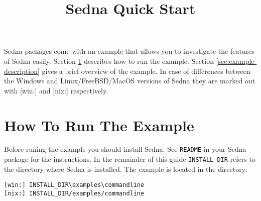 \documentclass[a4paper,12pt]{article}
\title{Sedna Quick Start}
\date{}
\begin{document}
\sloppy
\maketitle

Sedna packages come with an example that allows you to investigate the features
of Sedna easily. Section \ref{sec:how-to-run} describes how to run the example.
Section \ref{sec:example-description} gives a brief overview of the example. In
case of differences between the Windows and Linux/FreeBSD/MacOS versions of
Sedna they are marked out with [win:] and [nix:] respectively.

\section{How To Run The Example}
\label{sec:how-to-run}

Before runing the example you should install Sedna. See \verb!README! in your
Sedna package for the instructions. In the remainder of this guide
\verb!INSTALL_DIR! refers to the directory where Sedna is installed. The example
is located in the directory:

\begin{verbatim}
[win:] INSTALL_DIR\examples\commandline
[nix:] INSTALL_DIR/examples/commandline
\end{verbatim}
\end{document}
